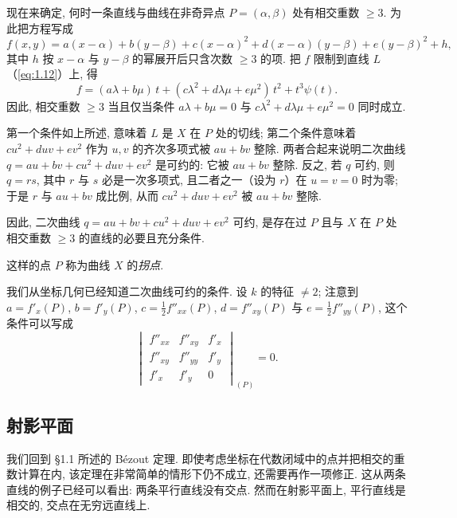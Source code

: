 现在来确定, 何时一条直线与曲线在非奇异点 $P = (\alpha, \beta)$ 处有相交重数 $\ge 3$. 为此把方程写成
\begin{equation}
	\label{eq:1.14}
	f(x,y) = a(x-\alpha) + b(y-\beta) + c(x-\alpha)^2 + d(x-\alpha)(y-\beta) + e(y-\beta)^2 + h,
\end{equation}
其中 $h$ 按 $x - \alpha$ 与 $y - \beta$ 的幂展开后只含次数 $\ge 3$ 的项. 把 $f$ 限制到直线 $L$（\eqref{eq:1.12}）上, 得
\[
	f = (a\lambda + b\mu)\, t + (c\lambda^2 + d\lambda\mu + e\mu^2)\, t^2 + t^3 \psi(t).
\]
因此, 相交重数 $\ge 3$ 当且仅当条件 $a\lambda + b\mu = 0$ 与 $c\lambda^2 + d\lambda\mu + e\mu^2 = 0$ 同时成立.

第一个条件如上所述, 意味着 $L$ 是 $X$ 在 $P$ 处的切线; 第二个条件意味着 $c u^2 + d u v + e v^2$ 作为 $u, v$ 的齐次多项式被 $a u + b v$ 整除. 两者合起来说明二次曲线 $q = a u + b v + c u^2 + d u v + e v^2$ 是可约的: 它被 $a u + b v$ 整除. 反之, 若 $q$ 可约, 则 $q = r s$, 其中 $r$ 与 $s$ 必是一次多项式, 且二者之一（设为 $r$）在 $u = v = 0$ 时为零; 于是 $r$ 与 $a u + b v$ 成比例, 从而 $c u^2 + d u v + e v^2$ 被 $a u + b v$ 整除.

因此, 二次曲线 $q = a u + b v + c u^2 + d u v + e v^2$ 可约, 是存在过 $P$ 且与 $X$ 在 $P$ 处相交重数 $\ge 3$ 的直线的必要且充分条件.

\begin{definition}[拐点]\label{def:flex}
	这样的点 $P$ 称为曲线 $X$ 的\emph{拐点}.
\end{definition}

我们从坐标几何已经知道二次曲线可约的条件. 设 $k$ 的特征 $\ne 2$; 注意到 $a = f'_x(P)$, $b = f'_y(P)$, $c = \tfrac{1}{2} f''_{xx}(P)$, $d = f''_{xy}(P)$ 与 $e = \tfrac{1}{2} f''_{yy}(P)$, 这个条件可以写成
\begin{equation}
	\label{eq:1.15}
	\begin{vmatrix}
		f''_{xx} & f''_{xy} & f'_x \\
		f''_{xy} & f''_{yy} & f'_y \\
		f'_x    & f'_y    & 0
	\end{vmatrix}_{(P)} = 0.
\end{equation}

\subsection{射影平面}

我们回到 §1.1 所述的 Bézout 定理. 即使考虑坐标在代数闭域中的点并把相交的重数计算在内, 该定理在非常简单的情形下仍不成立, 还需要再作一项修正. 这从两条直线的例子已经可以看出: 两条平行直线没有交点. 然而在射影平面上, 平行直线是相交的, 交点在无穷远直线上.

